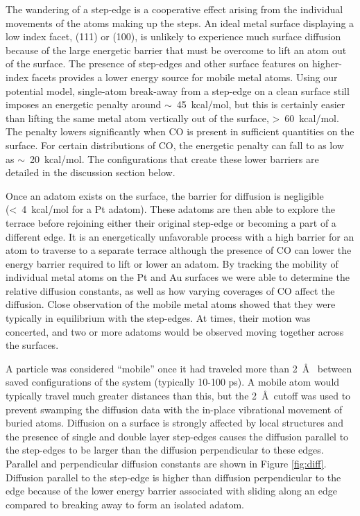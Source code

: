 The wandering of a step-edge is a cooperative effect arising from the
individual movements of the atoms making up the steps. An ideal metal
surface displaying a low index facet, (111) or (100), is unlikely to
experience much surface diffusion because of the large energetic
barrier that must be overcome to lift an atom out of the surface. The
presence of step-edges and other surface features on higher-index
facets provides a lower energy source for mobile metal atoms.  Using
our potential model, single-atom break-away from a step-edge on a
clean surface still imposes an energetic penalty around
$\sim$~45~kcal/mol, but this is certainly easier than lifting the same
metal atom vertically out of the surface, \textgreater~60~kcal/mol.
The penalty lowers significantly when CO is present in sufficient
quantities on the surface. For certain distributions of CO, the
energetic penalty can fall to as low as $\sim$~20~kcal/mol. The
configurations that create these lower barriers are detailed in the
discussion section below.

Once an adatom exists on the surface, the barrier for diffusion is
negligible (\textless~4~kcal/mol for a Pt adatom). These adatoms are
then able to explore the terrace before rejoining either their
original step-edge or becoming a part of a different edge. It is an
energetically unfavorable process with a high barrier for an atom to
traverse to a separate terrace although the presence of CO can lower
the energy barrier required to lift or lower an adatom. By tracking
the mobility of individual metal atoms on the Pt and Au surfaces we
were able to determine the relative diffusion constants, as well as
how varying coverages of CO affect the diffusion. Close observation of
the mobile metal atoms showed that they were typically in equilibrium
with the step-edges.  At times, their motion was concerted, and two or
more adatoms would be observed moving together across the surfaces.

A particle was considered ``mobile'' once it had traveled more than
2~\AA~ between saved configurations of the system (typically 10-100
ps). A mobile atom would typically travel much greater distances than
this, but the 2~\AA~cutoff was used to prevent swamping the diffusion
data with the in-place vibrational movement of buried atoms. Diffusion
on a surface is strongly affected by local structures and the presence
of single and double layer step-edges causes the diffusion parallel to
the step-edges to be larger than the diffusion perpendicular to these
edges. Parallel and perpendicular diffusion constants are shown in
Figure \ref{fig:diff}.  Diffusion parallel to the step-edge is higher
than diffusion perpendicular to the edge because of the lower energy
barrier associated with sliding along an edge compared to breaking
away to form an isolated adatom.

